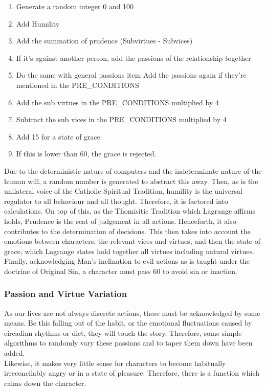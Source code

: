 \documentclass[11pt]{article}
\begin{document}
\begin{enumerate}
	\item Generate a random integer 0 and 100
	\item Add Humility 
	\item Add the summation of prudence (Subvirtues - Subvices) 
	\item If it's against another person, add the passions of the relationship together
	\item Do the same with general passions
	item Add the passions again if they're mentioned in the PRE\_CONDITIONS
	\item Add the sub virtues in the PRE\_CONDITIONS multiplied by 4
	\item Subtract the sub vices in the PRE\_CONDITIONS multiplied by 4
	\item Add 15 for a state of grace
	\item If this is lower than 60, the grace is rejected.
\end{enumerate}

Due to the deterministic nature of computers and the indeterminate nature of the human will, a random number is generated to abstract this away. Then, as is the unilateral voice of the Catholic Spiritual Tradition, humility is the universal regulator to all behaviour and all thought. Therefore, it is factored into calculations. On top of this, as the Thomisitic Tradition which Lagrange affirms holds, Prudence is the seat of judgement in all actions. Henceforth, it also contributes to the determination of decisions. This then takes into account the emotions between characters, the relevant vices and virtues, and then the state of grace, which Lagrange states hold together all virtues including natural virtues. Finally, acknowledging Man's inclination to evil actions as is taught under the doctrine of Original Sin, a character must pass 60 to avoid sin or inaction. \\
\subsubsection{Passion and Virtue Variation} 
As our lives are not always discrete actions, these must be acknowledged by some means. Be this falling out of the habit, or the emotional fluctuations caused by circadian rhythms or diet, they will touch the story. Therefore, some simple algorithms to randomly vary these passions and to taper them down have been added.\\

Likewise, it makes very little sense for characters to become habitually irreconcilably angry or in a state of pleasure. Therefore, there is a function which calms down the character. \\
\end{document}
